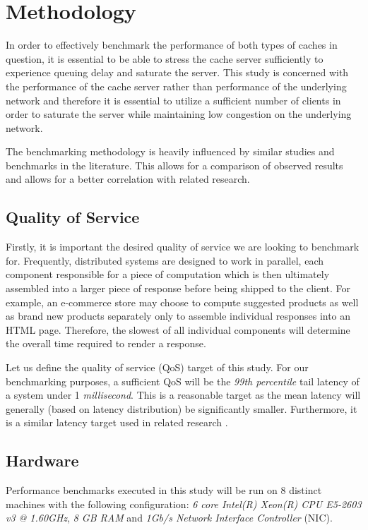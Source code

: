 \section{Methodology}

In order to effectively benchmark the performance of both types of caches in question, it is essential to be able to stress the cache server sufficiently to experience queuing delay and saturate the server. This study is concerned with the performance of the cache server rather than performance of the underlying network and therefore it is essential to utilize a sufficient number of clients in order to saturate the server while maintaining low congestion on the underlying network.

The benchmarking methodology is heavily influenced by similar studies and benchmarks in the literature. This allows for a comparison of observed results and allows for a better correlation with related research.


\subsection{Quality of Service}
Firstly, it is important the desired quality of service we are looking to benchmark for. Frequently, distributed systems are designed to work in parallel, each component responsible for a piece of computation which is then ultimately assembled into a larger piece of response before being shipped to the client. For example, an e-commerce store may choose to compute suggested products as well as brand new products separately only to assemble individual responses into an HTML page. Therefore, the slowest of all individual components will determine the overall time required to render a response.

Let us define the quality of service (QoS) target of this study. For our benchmarking purposes, a sufficient QoS will be the \textit{99th percentile} tail latency of a system under 1 \textit{millisecond}. This is a reasonable target as the mean latency will generally (based on latency distribution) be significantly smaller. Furthermore, it is a similar latency target used in related research \cite{leverich2014reconciling}.

\subsection{Hardware}
Performance benchmarks executed in this study will be run on 8 distinct machines with the following configuration: \textit{6 core Intel(R) Xeon(R) CPU E5-2603 v3 @ 1.60GHz}, \textit{8 GB RAM} and \textit{1Gb/s Network Interface Controller} (NIC).

